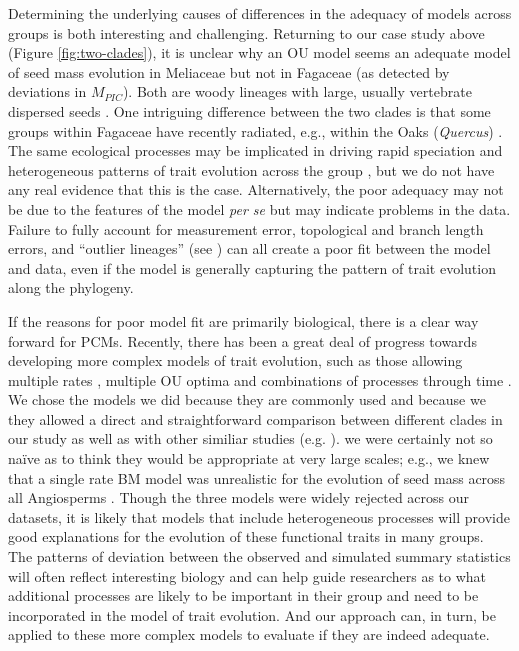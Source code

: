 \documentclass[a4paper,12pt]{article}
\begin{document}
Determining the underlying causes of differences in the adequacy of models across groups is both interesting and challenging. Returning to our case study above (Figure \ref{fig:two-clades}), it is unclear why an OU model seems an adequate model of seed mass evolution in Meliaceae but not in Fagaceae (as detected by deviations in $M_{PIC}$). Both are woody lineages with large, usually vertebrate dispersed seeds \citep{Pannell1987, Manos2001}. One intriguing difference between the two clades is that some groups within Fagaceae have recently radiated, e.g., within the Oaks (\emph{Quercus}) \citep{Simeone2013}. The same ecological processes may be implicated in driving rapid speciation and heterogeneous patterns of trait evolution across the group \citep{Schluter2000}, but we do not have any real evidence that this is the case. Alternatively, the poor adequacy may not be due to the features of the model \emph{per se} but may indicate problems in the data. Failure to fully account for measurement error, topological and branch length errors, and ``outlier lineages'' (see \citep{SlaterPennell}) can all create a poor fit between the model and data, even if the model is generally capturing the pattern of trait evolution along the phylogeny.

If the reasons for poor model fit are primarily biological, there is a clear way forward for PCMs. Recently, there has been a great deal of progress towards developing more complex models of trait evolution, such as those allowing multiple rates \citep{Omeara2006, Eastman2011}, multiple OU optima \citep{ButlerKing2004, Beaulieu2012, UyedaBayou} and combinations of processes through time \citep{SlaterMEE}. We chose the models we did because they are commonly used and because we they allowed a direct and straightforward comparison between different clades in our study as well as with other similiar studies (e.g. \citep{Harmon2010}). we were certainly not so na\"{i}ve as to think they would be appropriate at very large scales; e.g., we knew that a single rate BM model was unrealistic for the evolution of seed mass across all Angiosperms \citep{Moles2005}. Though the three  models were widely rejected across our datasets, it is likely that models that include heterogeneous processes will provide good explanations for the evolution of these functional traits in many groups.  The patterns of deviation between the observed and simulated summary statistics will often reflect interesting biology and can help guide researchers as to what additional processes are likely to be important in their group and need to be incorporated in the model of trait evolution. And our approach can, in turn, be applied to these more complex models to evaluate if they are indeed adequate. 
\end{document}
